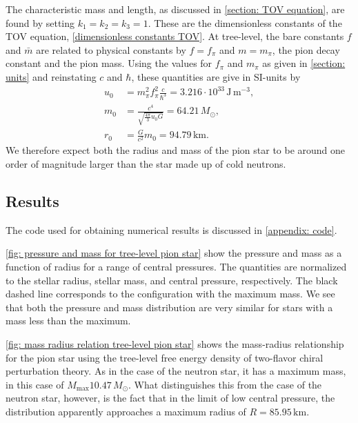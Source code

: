 The characteristic mass and length, as discussed in \autoref{section: TOV equation}, are found by setting $k_1 = k_2 = k_3 = 1$.
These are the dimensionless constants of the TOV equation, \autoref{dimensionless constants TOV}.
At tree-level, the bare constants $f$ and $\bar m$ are related to physical constants by $f = f_\pi$ and $m = m_\pi$, the pion decay constant and the pion mass.
Using the values for $f_\pi$ and $m_\pi$ as given in \autoref{section: units} and reinstating $c$ and $\hbar$, these quantities are give in SI-units by
%
\begin{align}
    u_0 & =m_\pi^2 f_\pi^2 \frac{c}{\hbar^3}
    = 3.216\cdot 10^{33} \, \text{J}\,\text{m}^{-3}, \\
    m_0 & = \frac{c^4}{\sqrt{\frac{4 \pi}{ 3} u_0 G}} = 64.21\, M_\odot, \\
    r_0 & = \frac{G}{c^2} m_0 = 94.79 \, \text{km}.
\end{align}
%
We therefore expect both the radius and mass of the pion star to be around one order of magnitude larger than the star made up of cold neutrons.


\subsection{Results}

The code used for obtaining numerical results is discussed in \autoref{appendix: code}.

\autoref{fig: pressure and mass for tree-level pion star} show the pressure and mass as a function of radius for a range of central pressures.
The quantities are normalized to the stellar radius, stellar mass, and central pressure, respectively.
The black dashed line corresponds to the configuration with the maximum mass.
We see that both the pressure and mass distribution are very similar for stars with a mass less than the maximum.

\autoref{fig: mass radius relation tree-level pion star} shows the mass-radius relationship for the pion star using the tree-level free energy density of two-flavor chiral perturbation theory.
As in the case of the neutron star, it has a maximum mass, in this case of $M_\text{max} 10.47\, M_\odot$.
What distinguishes this from the case of the neutron star, however, is the fact that in the limit of low central pressure, the distribution apparently approaches a maximum radius of $R = 85.95 \, \text{km}$.

